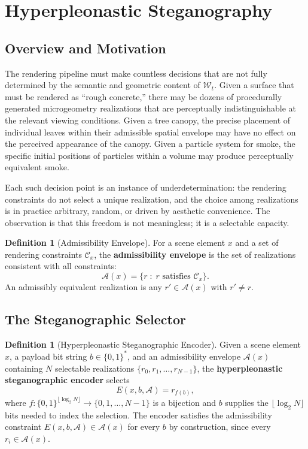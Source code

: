 \documentclass[12pt,a4paper]{article}
\theoremstyle{plain}
\theoremstyle{definition}
\newtheorem{definition}[theorem]{Definition}
\theoremstyle{remark}
\begin{document}

\appendix

\section{Hyperpleonastic Steganography}
\label{app:steg}

\subsection{Overview and Motivation}

The rendering pipeline must make countless decisions that are not fully determined by the semantic and geometric content of $\mathcal{W}_t$. Given a surface that must be rendered as ``rough concrete,'' there may be dozens of procedurally generated microgeometry realizations that are perceptually indistinguishable at the relevant viewing conditions. Given a tree canopy, the precise placement of individual leaves within their admissible spatial envelope may have no effect on the perceived appearance of the canopy. Given a particle system for smoke, the specific initial positions of particles within a volume may produce perceptually equivalent smoke.

Each such decision point is an instance of underdetermination: the rendering constraints do not select a unique realization, and the choice among realizations is in practice arbitrary, random, or driven by aesthetic convenience. The observation is that this freedom is not meaningless; it is a selectable capacity.

\begin{definition}[Admissibility Envelope]
For a scene element $x$ and a set of rendering constraints $\mathcal{C}_x$, the \textbf{admissibility envelope} is the set of realizations consistent with all constraints:
\[
\mathcal{A}(x) = \{ r \;:\; r \text{ satisfies } \mathcal{C}_x \}.
\]
An admissibly equivalent realization is any $r' \in \mathcal{A}(x)$ with $r' \neq r$.
\end{definition}

\subsection{The Steganographic Selector}

\begin{definition}[Hyperpleonastic Steganographic Encoder]
\label{def:steg}
Given a scene element $x$, a payload bit string $b \in \{0,1\}^*$, and an admissibility envelope $\mathcal{A}(x)$ containing $N$ selectable realizations $\{r_0, r_1, \ldots, r_{N-1}\}$, the \textbf{hyperpleonastic steganographic encoder} selects
\[
E(x, b, \mathcal{A}) = r_{f(b)},
\]
where $f : \{0,1\}^{\lfloor \log_2 N \rfloor} \to \{0, 1, \ldots, N-1\}$ is a bijection and $b$ supplies the $\lfloor \log_2 N \rfloor$ bits needed to index the selection. The encoder satisfies the admissibility constraint $E(x, b, \mathcal{A}) \in \mathcal{A}(x)$ for every $b$ by construction, since every $r_i \in \mathcal{A}(x)$.
\end{definition}
\end{document}
